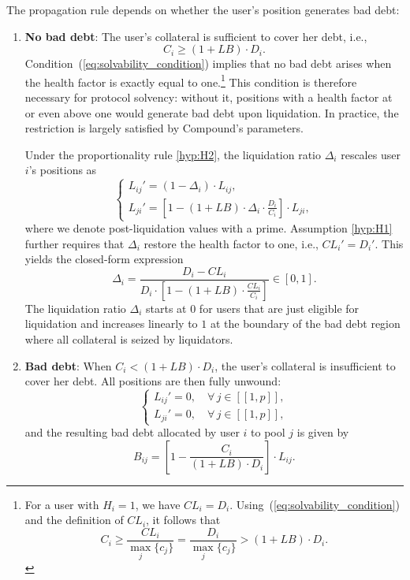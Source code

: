 \documentclass[a4paper,UKenglish,cleveref, autoref, thm-restate]{informs3}
\begin{document}
The propagation rule depends on whether the user's position generates bad debt:
\begin{enumerate}
    \item \textbf{No bad debt}: The user's collateral is sufficient to cover her debt, i.e.,
    \begin{equation}
        \label{eq:no_bad_debt}
        C_i \geq (1 + LB) \cdot D_i.
    \end{equation}\noindent
    Condition~(\ref{eq:solvability_condition}) implies that no bad debt arises when the health factor is exactly equal to one.\footnote{For a user with $H_i = 1$, we have $CL_i = D_i$. Using~(\ref{eq:solvability_condition}) and the definition of $CL_i$, it follows that
    \[
    C_i \geq \frac{CL_i}{\max_j\{c_j\}} = \frac{D_i}{\max_j\{c_j\}} > (1+LB)\cdot D_i.
    \]}
    This condition is therefore necessary for protocol solvency: without it, positions with a health factor at or even above one would generate bad debt upon liquidation. In practice, the restriction is largely satisfied by Compound's parameters.

    Under the proportionality rule \ref{hyp:H2}, the liquidation ratio $\Delta_i$ rescales user $i$'s positions as
    \begin{equation*}
    \begin{cases}
        L_{ij}' = (1-\Delta_i)\cdot L_{ij},\\
        L_{ji}' = \left[1 - (1+LB)\cdot \Delta_i \cdot \frac{D_i}{C_i}\right] \cdot L_{ji},
    \end{cases}
    \end{equation*}
    where we denote post-liquidation values with a prime. Assumption \ref{hyp:H1} further requires that $\Delta_i$ restore the health factor to one, i.e., $CL_i' = D_i'$. This yields the closed-form expression
    \[
        \Delta_i = \frac{D_i - CL_i}{D_i \cdot\left[1 - (1+LB)\cdot \frac{CL_i}{C_i}\right]} \in [0,1].
    \]
    The liquidation ratio $\Delta_i$ starts at $0$ for users that are just eligible for liquidation and increases linearly to $1$ at the boundary of the bad debt region where all collateral is seized by liquidators.
    \item \textbf{Bad debt}: When $C_i < (1+LB)\cdot D_i$, the user's collateral is insufficient to cover her debt. All positions are then fully unwound:
    \begin{equation*}
    \begin{cases}
        L_{ij}' = 0, \quad \forall\, j \in [\![1,p]\!],\\
        L_{ji}' = 0, \quad \forall\, j \in [\![1,p]\!],
    \end{cases}
    \end{equation*}
    and the resulting bad debt allocated by user $i$ to pool $j$ is given by
    \[
        B_{ij} = \left[1 - \frac{C_i}{(1+LB)\cdot D_i}\right]\cdot L_{ij}.
    \]
\end{enumerate}
\end{document}
